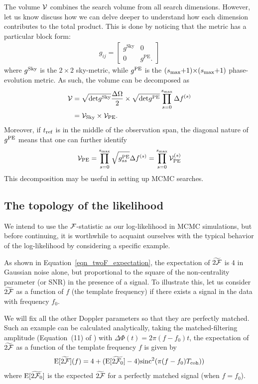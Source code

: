 \documentclass[aps, prd, twocolumn, superscriptaddress, floatfix, showpacs, nofootinbib, longbibliography]{revtex4-1}
\begin{document}
The volume $\mathcal{V}$ combines the search volume from all search dimensions. However,
let us know discuss how we can delve deeper to understand how each dimension
contributes to the total product. This is done by noticing that the metric has
a particular block form:
\begin{align}
g_{ij} = \left[
\begin{array}{cc}
g^{\textrm{Sky}} & 0 \\
0 & g^{\textrm{PE}}.
\end{array}
\right]
\end{align}
where $g^{\rm Sky}$ is the $2\times2$ sky-metric, while $g^{\rm PE}$ is the
$(s_{\textrm{max}}{+}1){\times}(s_{\textrm{max}}{+}1)$ phase-evolution metric.
As such, the volume can be decomposed as
\begin{align}
\mathcal{V} & =
\sqrt{\textrm{det}g^{\rm Sky}}\frac{\Delta\Omega}{2} \times
\sqrt{\textrm{det}g^{\rm PE}}\prod_{s=0}^{s_{\textrm{max}}}\Delta f^{(s)} \\
& = \mathcal{V}_{\rm Sky} \times \mathcal{V}_{\rm PE}.
\label{eqn_metric_volume}
\end{align}
Moreover, if $t_{\rm ref}$ is in the middle of the observation span, the diagonal
nature of $g^{\rm PE}$ means that one can further identify
\begin{align}
\mathcal{V}_{\rm PE} = \prod_{s=0}^{s_{\textrm{max}}}\sqrt{g^{\rm PE}_{ss}} \Delta f^{(s)}
= \prod_{s=0}^{s_{\textrm{max}}}\mathcal{V}_{\rm PE}^{(s)}
\end{align}
This decomposition may be useful in setting up MCMC searches.

\subsection{The topology of the likelihood}
\label{sec_topology}

We intend to use the ${\mathcal{F}}$-statistic as our log-likelihood in MCMC simulations,
but before continuing, it is worthwhile to acquaint ourselves with the typical
behavior of the log-likelihood by considering a specific example.

As shown in Equation~\eqref{eqn_twoF_expectation}, the expectation of
$\widetilde{2{\mathcal{F}}}$ is 4 in Gaussian noise alone, but proportional to the square
of the non-centrality parameter (or SNR) in the presence of a signal. To
illustrate this, let us consider $\widetilde{2{\mathcal{F}}}$ as a function of $f$ (the
template frequency) if there exists a signal in the data with frequency $f_0$.

We will fix all the other Doppler parameters so that they are perfectly
matched.  Such an example can be calculated analytically, taking the
matched-filtering amplitude (Equation~(11) of \citep{prix2005}) with
$\Delta\Phi(t) = 2\pi(f - f_0) t$, the expectation of $\widetilde{2{\mathcal{F}}}$ as a
function of the template frequency $f$ is given by
\begin{equation}
\textrm{E}[\widetilde{2{\mathcal{F}}}](f) = 4 +
(\textrm{E}[\widetilde{2{\mathcal{F}}_0}] -4)\textrm{sinc}^{2}(\pi(f-f_0)T_{\rm coh}))
\label{eqn_grid_prediction}
\end{equation}
where $\textrm{E}[\widetilde{2{\mathcal{F}}_0}]$ is the expected $\widetilde{2{\mathcal{F}}}$ for
a perfectly matched signal (when $f=f_0$).
\end{document}
